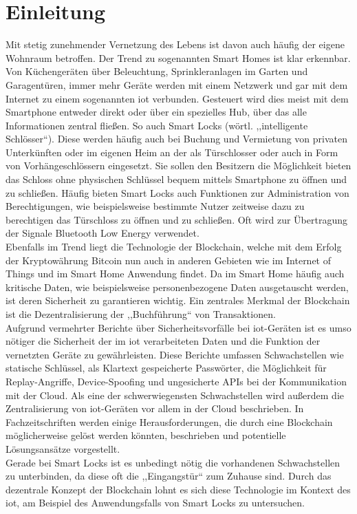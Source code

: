 \section{Einleitung}
\label{sec:intro}
    Mit stetig zunehmender Vernetzung des Lebens ist davon auch häufig der eigene Wohnraum betroffen. 
    Der Trend zu sogenannten Smart Homes ist klar erkennbar\cite{Paley2018}. 
    Von Küchengeräten über Beleuchtung, Sprinkleranlagen im Garten und Ga\-ra\-gen\-tü\-ren, immer mehr Geräte werden mit einem Netzwerk und gar mit dem Internet zu einem sogenannten \gls{iot} verbunden. 
    Gesteuert wird dies meist mit dem Smartphone entweder direkt oder über ein spezielles Hub, über das alle Informationen zentral fließen.
    So auch Smart Locks (wörtl. ,,intelligente Schlösser``).
    Diese werden häufig auch bei Buchung und Vermietung von privaten Unterkünften oder im eigenen Heim an der als Türschlosser oder auch in Form von Vorhängeschlössern eingesetzt.
    Sie sollen den Besitzern die Möglichkeit bieten das Schloss ohne physischen Schlüssel bequem mittels Smartphone zu öffnen und zu schließen\cite{Ho2016}.
    Häufig bieten Smart Locks auch Funktionen zur Administration von Berechtigungen, wie beispielsweise bestimmte Nutzer zeitweise dazu zu berechtigen das Türschloss zu öffnen und zu schließen\cite{Ye2017}.
    Oft wird zur Übertragung der Signale Bluetooth Low Energy verwendet\cite{Fuller2017}.
    \medskip\\
    Ebenfalls im Trend liegt die Technologie der Blockchain, welche mit dem Erfolg der Kryptowährung Bitcoin nun auch in anderen Gebieten wie im Internet of Things und im Smart Home Anwendung findet\cite{Conoscenti2016,Kshetri2017}.
    Da im Smart Home häufig auch kritische Daten, wie beispielsweise personenbezogene Daten ausgetauscht werden, ist deren Sicherheit zu garantieren wichtig.
    Ein zentrales Merkmal der Blockchain ist die Dezentralisierung der ,,Buchführung`` von Transaktionen.
    \medskip\\
    Aufgrund vermehrter Berichte über Sicherheitsvorfälle bei \gls{iot}-Geräten\cite{Goodin2018} ist es umso nötiger die Sicherheit der im \gls{iot} verarbeiteten Daten und die Funktion der vernetzten Geräte zu gewährleisten.
    Diese Berichte umfassen Schwachstellen wie statische Schlüssel, als Klartext gespeicherte Passwörter, die Möglichkeit für Replay-Angriffe, Device-Spoofing\cite{Rose2016} und ungesicherte APIs bei der Kommunikation mit der Cloud\cite{Stykas2018}. 
    Als eine der schwerwiegensten Schwachstellen wird außerdem die Zentralisierung von \gls{iot}-Geräten vor allem in der Cloud beschrieben\cite{Kshetri2017}.
    In Fachzeitschriften werden einige Herausforderungen, die durch eine Blockchain möglicherweise gelöst werden könnten, beschrieben und potentielle Lösungsansätze vorgestellt\cite{Kshetri2017}.
    \medskip\\
    Gerade bei Smart Locks ist es unbedingt nötig die vorhandenen Schwachstellen zu unterbinden, da diese oft die ,,Eingangstür`` zum Zuhause sind.
    Durch das dezentrale Konzept der Blockchain\cite{Nakamoto2008} lohnt es sich diese Technologie im Kontext des \gls{iot}, am Beispiel des Anwendungsfalls von Smart Locks zu untersuchen.
    
